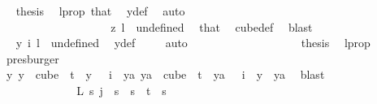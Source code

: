 \begin{isabellebody}
\ \isamarkupfalse%
\ {\isacharquery}{\kern0pt}thesis\ \isamarkupfalse%
\ l{\isacharunderscore}{\kern0pt}prop\ that{\isacharparenleft}{\kern0pt}{}{\isacharparenright}{\kern0pt}\ \isamarkupfalse%
\ y{\isacharunderscore}{\kern0pt}def\ \isamarkupfalse%
\ auto\isanewline
\ \ \ \ \ \ \ \ \ \ \ \ \ \ \isamarkupfalse%
\isanewline
\ \ \ \ \ \ \ \ \ \ \ \ \ \ \ \ \isamarkupfalse%
\ {}\isanewline
\ \ \ \ \ \ \ \ \ \ \ \ \ \ \ \ \isamarkupfalse%
\ \isamarkupfalse%
\ {\isachardoublequoteopen}z\ l\ {\isacharequal}{\kern0pt}\ undefined{\isachardoublequoteclose}\ \isamarkupfalse%
\ that\ \isamarkupfalse%
\ cube{\isacharunderscore}{\kern0pt}def\ \isamarkupfalse%
\ blast\isanewline
\ \ \ \ \ \ \ \ \ \ \ \ \ \ \ \ \isamarkupfalse%
\ \isamarkupfalse%
\ {\isachardoublequoteopen}y\ i\ l\ {\isacharequal}{\kern0pt}\ undefined{\isachardoublequoteclose}\ \isamarkupfalse%
\ y{\isacharunderscore}{\kern0pt}def\ \isamarkupfalse%
\ {}\ \isamarkupfalse%
\ auto\isanewline
\ \ \ \ \ \ \ \ \ \ \ \ \ \ \ \ \isamarkupfalse%
\ \isamarkupfalse%
\ {\isacharquery}{\kern0pt}thesis\ \isamarkupfalse%
\ l{\isacharunderscore}{\kern0pt}prop\ \isamarkupfalse%
\ presburger\isanewline
\ \ \ \ \ \ \ \ \ \ \ \ \ \ \isamarkupfalse%
\isanewline
\ \ \ \ \ \ \ \ \ \ \ \ \isamarkupfalse%
\isanewline
\ \ \ \ \ \ \ \ \ \ \ \ \isamarkupfalse%
\ \isamarkupfalse%
\ {\isachardoublequoteopen}{\isasymexists}y{\isachardot}{\kern0pt}\ {\isacharparenleft}{\kern0pt}y\ {\isasymin}\ cube\ {}\ t\ {\isasymand}\ y\ {}\ {\isacharequal}{\kern0pt}\ i{\isacharparenright}{\kern0pt}\ {\isasymand}\ {\isacharparenleft}{\kern0pt}{\isasymforall}ya{\isachardot}{\kern0pt}\ ya\ {\isasymin}\ cube\ {}\ t\ {\isasymand}\ ya\ {}\ {\isacharequal}{\kern0pt}\ i\ {\isasymlongrightarrow}\ y\ {\isacharequal}{\kern0pt}\ ya{\isacharparenright}{\kern0pt}{\isachardoublequoteclose}\ \isamarkupfalse%
\ blast\isanewline
\isanewline
\ \ \ \ \ \ \ \ \ \ \isamarkupfalse%
\isanewline
\ \ \ \ \ \ \ \ \ \ \isamarkupfalse%
\ \isamarkupfalse%
\ {\isachardoublequoteopen}L\ s\ j\ {\isacharequal}{\kern0pt}\ s{\isachardoublequoteclose}\ \ {\isachardoublequoteopen}s\ {\isacharless}{\kern0pt}\ t{\isachardoublequoteclose}\ \ s\ \isamarkupfalse%

\end{isabellebody}
